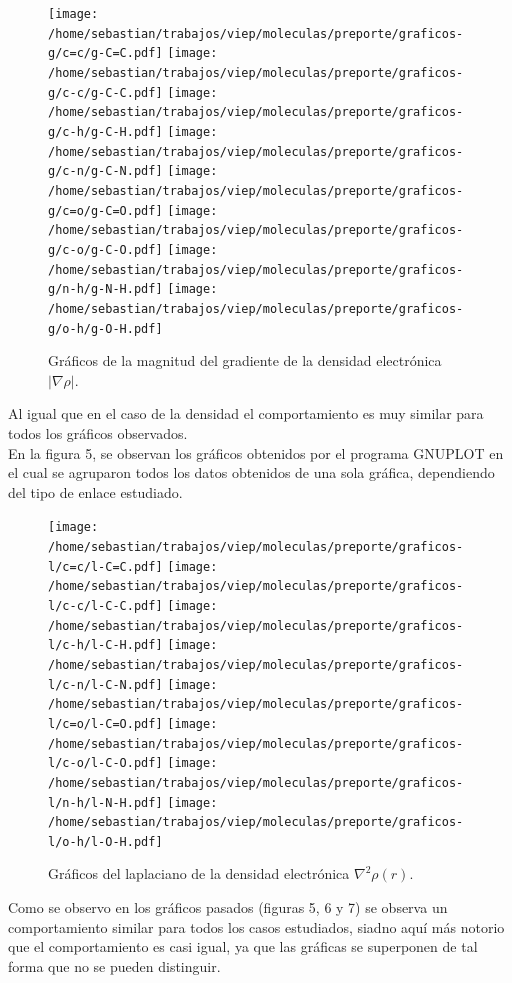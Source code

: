 \documentclass[12pt,letterpaper]{article}
\begin{document}
\begin{figure}[H]
\begin{center}
\texttt{[image: /home/sebastian/trabajos/viep/moleculas/preporte/graficos-g/c=c/g-C=C.pdf]}
\texttt{[image: /home/sebastian/trabajos/viep/moleculas/preporte/graficos-g/c-c/g-C-C.pdf]}
\texttt{[image: /home/sebastian/trabajos/viep/moleculas/preporte/graficos-g/c-h/g-C-H.pdf]}
\texttt{[image: /home/sebastian/trabajos/viep/moleculas/preporte/graficos-g/c-n/g-C-N.pdf]}
\texttt{[image: /home/sebastian/trabajos/viep/moleculas/preporte/graficos-g/c=o/g-C=O.pdf]}
\texttt{[image: /home/sebastian/trabajos/viep/moleculas/preporte/graficos-g/c-o/g-C-O.pdf]}
\texttt{[image: /home/sebastian/trabajos/viep/moleculas/preporte/graficos-g/n-h/g-N-H.pdf]}
\texttt{[image: /home/sebastian/trabajos/viep/moleculas/preporte/graficos-g/o-h/g-O-H.pdf]}
\end{center}
\caption{Gráficos de la magnitud del gradiente de la densidad electrónica $|\nabla\rho|$.}
\end{figure}
Al igual que en el caso de la densidad el comportamiento es muy similar para todos los gráficos observados.\\ 
En la figura 5, se observan los gráficos obtenidos por el programa GNUPLOT en el cual se agruparon todos los datos obtenidos de una sola gráfica, dependiendo del tipo de enlace estudiado.\\
\begin{figure}[H]
\begin{center}
\texttt{[image: /home/sebastian/trabajos/viep/moleculas/preporte/graficos-l/c=c/l-C=C.pdf]}
\texttt{[image: /home/sebastian/trabajos/viep/moleculas/preporte/graficos-l/c-c/l-C-C.pdf]}
\texttt{[image: /home/sebastian/trabajos/viep/moleculas/preporte/graficos-l/c-h/l-C-H.pdf]}
\texttt{[image: /home/sebastian/trabajos/viep/moleculas/preporte/graficos-l/c-n/l-C-N.pdf]}
\texttt{[image: /home/sebastian/trabajos/viep/moleculas/preporte/graficos-l/c=o/l-C=O.pdf]}
\texttt{[image: /home/sebastian/trabajos/viep/moleculas/preporte/graficos-l/c-o/l-C-O.pdf]}
\texttt{[image: /home/sebastian/trabajos/viep/moleculas/preporte/graficos-l/n-h/l-N-H.pdf]}
\texttt{[image: /home/sebastian/trabajos/viep/moleculas/preporte/graficos-l/o-h/l-O-H.pdf]}
\caption{Gráficos del laplaciano de la densidad electrónica $\nabla^2\rho(r)$.} 
\end{center}

\end{figure}

Como se observo en los gráficos pasados (figuras 5, 6 y 7) se observa un comportamiento similar para todos los casos estudiados, siadno aquí más notorio que el comportamiento es casi igual, ya que las gráficas se superponen de tal forma que no se pueden distinguir. \\
\end{document}
